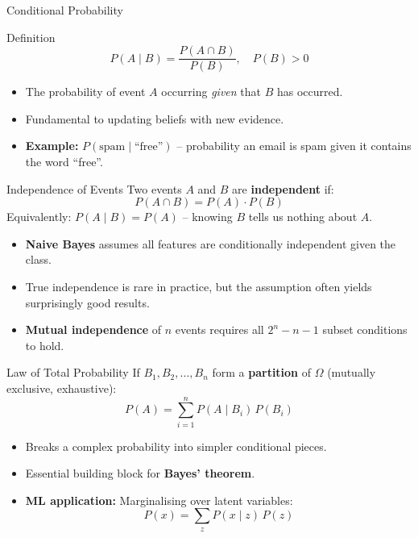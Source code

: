 \begin{frame}{Conditional Probability}
\begin{block}{Definition}
\[
P(A \mid B) = \frac{P(A \cap B)}{P(B)}, \quad P(B) > 0
\]
\end{block}
\begin{itemize}
    \item The probability of event $A$ occurring \emph{given} that $B$ has occurred.
    \item Fundamental to updating beliefs with new evidence.
    \item \textbf{Example:} $P(\text{spam} \mid \text{``free''})$ -- probability an email is spam given it contains the word ``free''.
\end{itemize}
\end{frame}

\begin{frame}{Independence of Events}
Two events $A$ and $B$ are \textbf{independent} if:
\[
P(A \cap B) = P(A) \cdot P(B)
\]
Equivalently: $P(A \mid B) = P(A)$ -- knowing $B$ tells us nothing about $A$.
\vspace{6pt}
\begin{itemize}
    \item \textbf{Naive Bayes} assumes all features are conditionally independent given the class.
    \item True independence is rare in practice, but the assumption often yields surprisingly good results.
    \item \textbf{Mutual independence} of $n$ events requires all $2^n - n - 1$ subset conditions to hold.
\end{itemize}
\end{frame}

\begin{frame}{Law of Total Probability}
If $B_1, B_2, \dots, B_n$ form a \textbf{partition} of $\Omega$ (mutually exclusive, exhaustive):
\[
\boxed{P(A) = \sum_{i=1}^{n} P(A \mid B_i)\, P(B_i)}
\]
\begin{itemize}
    \item Breaks a complex probability into simpler conditional pieces.
    \item Essential building block for \textbf{Bayes' theorem}.
    \item \textbf{ML application:} Marginalising over latent variables:
    \[
        P(x) = \sum_{z} P(x \mid z)\, P(z)
    \]
\end{itemize}
\end{frame}

